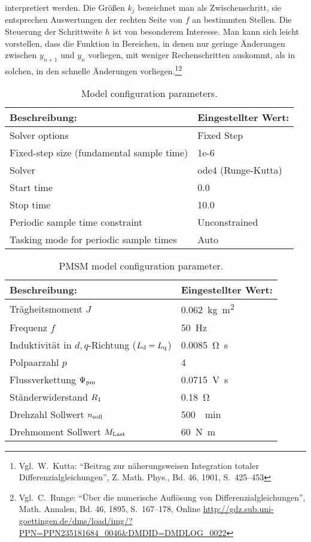 interpretiert werden.
Die Größen $k_j$ bezeichnet man als Zwischenschritt, sie entsprechen Auswertungen der rechten Seite von $f$ an bestimmten Stellen.
Die Steuerung der Schrittweite $h$ ist von besonderem Interesse.
Man kann sich leicht vorstellen, dass die Funktion in Bereichen, in denen nur geringe Änderungen zwischen $y_{n+1}$ und $y_n$ vorliegen, mit weniger Rechenschritten auskommt, als in solchen, in den schnelle Änderungen vorliegen.\footnote{Vgl.~W.\ Kutta: \enquote{Beitrag zur näherungsweisen Integration totaler Differenzialgleichungen}, Z. Math. Phys., Bd. 46, 1901, S.~425--453}\footnote{Vgl.~C.\ Runge: \enquote{Über die numerische Auflösung von Differenzialgleichungen}, Math. Annalen, Bd. 46, 1895, S.~167--178, Online \url{http://gdz.sub.uni-goettingen.de/dms/load/img/?PPN=PPN235181684_0046&DMDID=DMDLOG_0022}}


\begin{table}[h!]
	\centering
	\caption{Model configuration parameters.}
	\label{tab:model-parameter}
	\begin{tabularx}{0.8\textwidth}{ll}
		\toprule
		Beschreibung: & Eingestellter Wert: \\
		\midrule
		Solver options	& Fixed Step\\
		Fixed-step size (fundamental sample time)	& 1e-6 \\
		Solver	& ode4 (Runge-Kutta) \\
		Start time & 0.0 \\
		Stop time & 10.0\\
		Periodic sample time constraint & Unconstrained \\
		Tasking mode for periodic sample times & Auto \\
		\bottomrule
	\end{tabularx}
\end{table}
\begin{table}[h!]
	\centering
	\caption{PMSM model configuration parameter.}
	\label{tab:pmsm-parameter}
	\begin{tabularx}{0.8\textwidth}{ll}
		\toprule
		Beschreibung: & Eingestellter Wert: \\
		\midrule
		Trägheitsmoment $J$ & \SI{0.062}{\kilogram\square\meter} \\
		Frequenz $f$ & \SI{50}{\hertz}\\
		Induktivität in $d,q$-Richtung ($L_{\mathrm{d}}=L_{\mathrm{q}}$) & \SI{0.0085}{\ohm\second}\\
		Polpaarzahl $p$ & 4 \\
		Flussverkettung $\Psi_{\mathrm{pm}}$ & \SI{0.0715}{\volt\second}\\
		Ständerwiderstand $R_{\mathrm{1}}$ & \SI{0.18}{\ohm}\\
		Drehzahl Sollwert $n_{\mathrm{soll}}$ & \SI{500}{\per\minute}\\
		Drehmoment Sollwert $M_{\mathrm{Last}}$ & \SI{60}{\newton\meter}\\
		\bottomrule
	\end{tabularx}
\end{table}
\newpage


